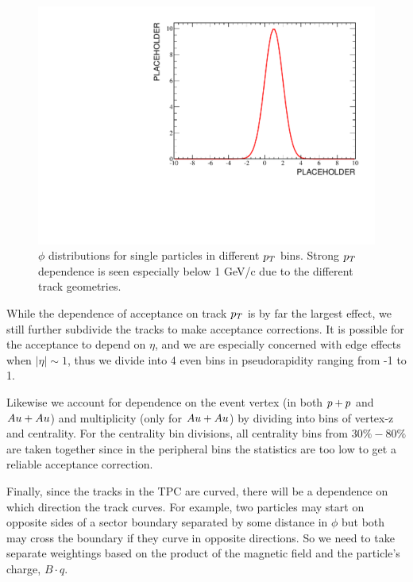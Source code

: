 \begin{figure}[htbp]
\begin{center}
\includegraphics[scale=.8]{Plots/Placeholder.pdf}
\end{center}
\caption[$\pt$ dependence of $\phi$ acceptance]{$\phi$ distributions for single particles in different $\pt$ bins. Strong $\pt$ dependence is seen especially below 1 GeV/c due to the different track geometries.}
\label{fig:PtDependPhi}
\end{figure}

While the dependence of acceptance on track $\pt$ is by far the largest effect, we still further subdivide the tracks to make acceptance corrections. It is possible for the acceptance to depend on $\eta$, and we are especially concerned with edge effects when  $|\eta| \sim 1$, thus we divide into 4 even bins in pseudorapidity ranging from -1 to 1.

Likewise we account for dependence on the event vertex (in both $p+p$ and $Au + Au$) and multiplicity (only for $Au + Au$) by dividing into bins of vertex-z and centrality. For the centrality bin divisions, all centrality bins from $30\%-80\%$ are taken together since in the peripheral bins the statistics are too low to get a reliable acceptance correction.

Finally, since the tracks in the TPC are curved, there will be a dependence on which direction the track curves. For example, two particles may start on opposite sides of a sector boundary separated by some distance in $\phi$ but both may cross the boundary if they curve in opposite directions. So we need to take separate weightings based on the product of the magnetic field and the particle's charge, $B \cdot q$. 


